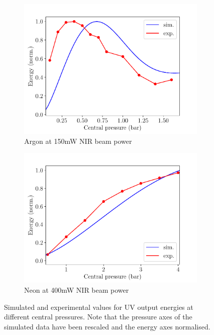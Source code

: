 \documentclass[a4paper]{jpconf}
\begin{document}
\begin{figure}[h]
\centering
 \begin{subfigure}{0.5\textwidth}
\includegraphics[width=\textwidth]{im/energies_Ar}
\caption{Argon at 150mW NIR beam power}\label{im:sim_v_measured_Ar}
\end{subfigure}
 \begin{subfigure}{0.5\textwidth}
\includegraphics[width=\textwidth]{im/energies_Ne}
\caption{Neon at 400mW NIR beam power}\label{im:sim_v_measured_Ne}
\end{subfigure}
\caption{Simulated and experimental values for UV output energies at different central pressures. Note that the pressure axes of the simulated data have been rescaled and the energy axes normalised.}\label{im:sim_v_measured}
\end{figure}
\end{document}
